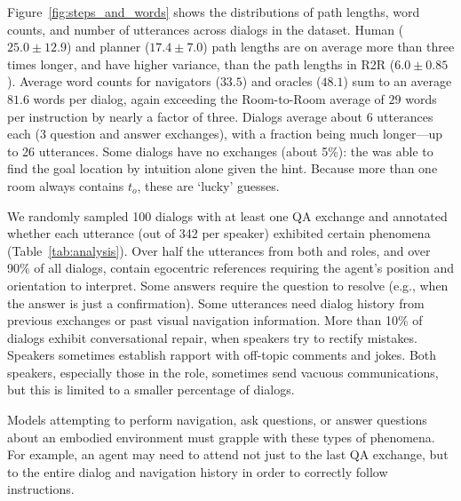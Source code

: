 Figure~\ref{fig:steps_and_words} shows the distributions of path lengths, word counts, and number of utterances across dialogs in the \dataset{} dataset.
Human ($25.0\pm12.9$) and planner ($17.4\pm7.0$) path lengths are on average more than three times longer, and have higher variance, than the path lengths in R2R ($6.0\pm0.85$).
Average word counts for navigators ($33.5$) and oracles ($48.1$) sum to an average $81.6$ words per dialog, again exceeding the Room-to-Room average of $29$ words per instruction by nearly a factor of three.
Dialogs average about 6 utterances each (3 question and answer exchanges), with a fraction being much longer---up to 26 utterances.
Some dialogs have no exchanges (about 5\%): the \nav{} was able to find the goal location by intuition alone given the hint.
Because more than one room always contains $t_o$, these are `lucky' guesses.

We randomly sampled 100 dialogs with at least one QA exchange and annotated whether each utterance (out of 342 per speaker) exhibited certain phenomena (Table~\ref{tab:analysis}).
Over half the utterances from both \nav{} and \ora{} roles, and over 90\% of all dialogs, contain egocentric references requiring the agent's position and orientation to interpret.
Some \ora{} answers require the \nav{} question to resolve (e.g., when the answer is just a confirmation).
Some utterances need dialog history from previous exchanges or past visual navigation information.
More than 10\% of dialogs exhibit conversational repair, when speakers try to rectify mistakes.
Speakers sometimes establish rapport with off-topic comments and jokes.
Both speakers, especially those in the \nav{} role, sometimes send vacuous communications, but this is limited to a smaller percentage of dialogs.

Models attempting to perform navigation, ask questions, or answer questions about an embodied environment must grapple with these types of phenomena.
For example, an agent may need to attend not just to the last QA exchange, but to the entire dialog and navigation history in order to correctly follow instructions.
